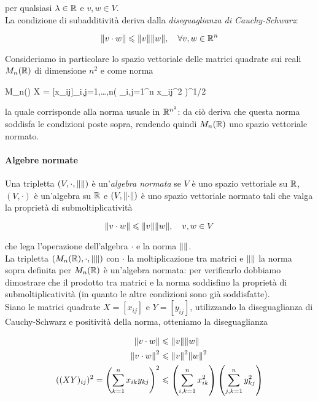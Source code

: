 per qualsiasi $ \lambda \in \mathbb{R} $ e $ v,w \in V $.\\
La condizione di subadditività deriva dalla \textit{diseguaglianza di Cauchy-Schwarz}:

\begin{equation}
	\norm{v \cdot w} \leqslant \norm{v} \norm{w} \qcomma \forall v,w \in \R^{n}
\end{equation}

Consideriamo in particolare lo spazio vettoriale delle matrici quadrate sui reali $ M_{n}(\mathbb{R}) $ di dimensione $ n^{2} $ e come norma

\map{\norm{}}
	{M_{n}(\R)}{\R}
	{X = [x_{ij}]_{i,j=1,\dots,n}}{\left( \sum_{i,j=1}^{n} x_{ij}^{2} \right)^{1/2}}
	
la quale corrisponde alla norma usuale in $ \mathbb{R}^{n^{2}} $: da ciò deriva che questa norma soddisfa le condizioni poste sopra, rendendo quindi $ M_{n}(\mathbb{R}) $ uno spazio vettoriale normato.\\

\paragraph{Algebre normate}

Una tripletta $ (V,\cdot,\norm{}) $ è un'\textit{algebra normata} se $ V $ è uno spazio vettoriale su $ \mathbb{R} $, $ (V,\cdot) $ è un'algebra su $ \mathbb{R} $ e $ (V,\norm{\cdot}) $ è uno spazio vettoriale normato tali che valga la proprietà di submoltiplicatività

\begin{equation}
	\norm{v \cdot w} \leqslant \norm{v} \norm{w} \qcomma v,w \in V
\end{equation}

che lega l'operazione dell'algebra $ \cdot $ e la norma $ \norm{} $.\\
La tripletta $ (M_{n}(\mathbb{R}),\cdot,\norm{}) $ con $ \cdot $ la moltiplicazione tra matrici e $ \norm{} $ la norma sopra definita per $ M_{n}(\mathbb{R}) $ è un'algebra normata: per verificarlo dobbiamo dimostrare che il prodotto tra matrici e la norma soddisfino la proprietà di submoltiplicatività (in quanto le altre condizioni sono già soddisfatte).\\
Siano le matrici quadrate $ X = [x_{ij}] $ e $ Y = [y_{ij}] $, utilizzando la diseguaglianza di Cauchy-Schwarz e positività della norma, otteniamo la diseguaglianza

\begin{align}
	\norm{v \cdot w} &\leqslant \norm{v} \norm{w} \\
	\norm{v \cdot w}^{2} &\leqslant \norm{v}^{2} \norm{w}^{2} \\
	((X Y)_{ij})^{2} = \left( \sum_{k=1}^{n} x_{ik} y_{kj} \right)^{2} &\leqslant \left( \sum_{i,k=1}^{n} x_{ik}^{2} \right) \left( \sum_{j,k=1}^{n} y_{kj}^{2} \right)
\end{align}

